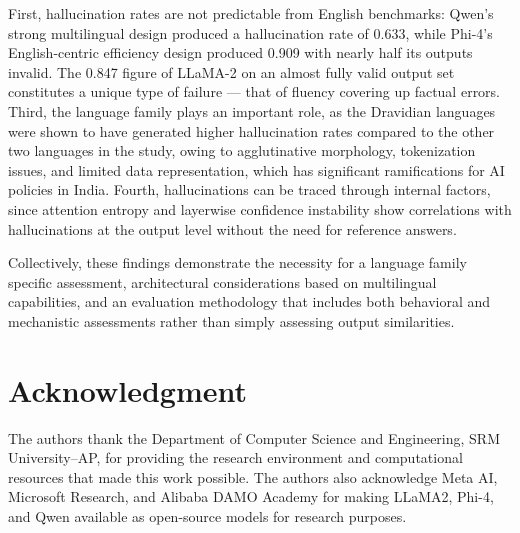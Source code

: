 \documentclass[conference]{IEEEtran}
\begin{document}
First, hallucination rates are not predictable from English
benchmarks: Qwen’s strong multilingual design produced a
hallucination rate of 0.633, while Phi-4’s English-centric efficiency design produced 0.909 with nearly half its outputs
invalid. The 0.847 figure of LLaMA-2 on an almost fully valid output set constitutes a unique type of failure — that of fluency covering up factual errors. Third, the language family plays an important role, as the Dravidian languages were shown to have generated higher hallucination rates compared to the other two languages in the study, owing to agglutinative morphology, tokenization issues, and limited data representation, which has significant ramifications for AI policies in India. Fourth, hallucinations can be traced through internal factors, since attention entropy and layerwise confidence instability show correlations with hallucinations at the output level without the need for reference answers.

Collectively, these findings demonstrate the necessity for a
language family specific assessment, architectural considerations based on multilingual capabilities, and an evaluation methodology that includes both behavioral and mechanistic assessments rather than simply assessing output similarities.

\section*{Acknowledgment}

The authors thank the Department of Computer Science and
Engineering, SRM University–AP, for providing the research
environment and computational resources that made this work
possible. The authors also acknowledge Meta AI, Microsoft
Research, and Alibaba DAMO Academy for making LLaMA2, Phi-4, and Qwen available as open-source models for
research purposes.
\end{document}
